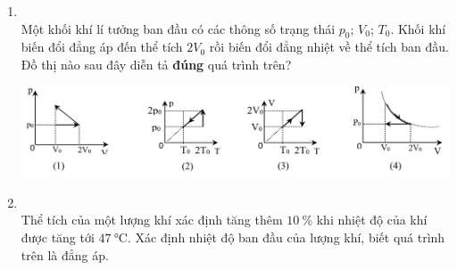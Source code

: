 \begin{enumerate}[label=\bfseries Câu \arabic*:, leftmargin=1.7cm]
\item{}\\ 
Một khối khí lí tưởng ban đầu có các thông số trạng thái $p_0$; $V_0$; $T_0$. Khối khí biến đổi đẳng áp đến thể tích $2V_0$ rồi biến đổi đẳng nhiệt về thể tích ban đầu. Đồ thị nào sau đây diễn tả \textbf{đúng} quá trình trên?
\begin{center}
	\includegraphics[width=0.9\linewidth]{../figs/VN12-Y24-PH-SYL-011P-4}
\end{center}

\item {}\\
Thể tích của một lượng khí xác định tăng thêm $\SI{10}{\percent}$  khi nhiệt độ của khí được tăng tới $\SI{47}{\celsius}$. Xác định nhiệt độ ban đầu của lượng khí, biết quá trình trên là đẳng áp.


\end{enumerate}
